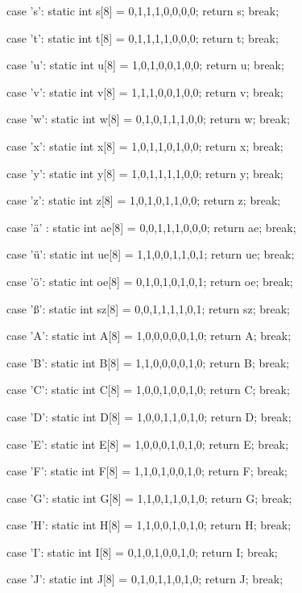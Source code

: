 {{    case 's':
    static int s[8] = {0,1,1,1,0,0,0,0};
    return s;
    break;

    case 't':
    static int t[8] = {0,1,1,1,1,0,0,0};
    return t;
    break;

    case 'u':
    static int u[8] = {1,0,1,0,0,1,0,0};
    return u;
    break;

    case 'v':
    static int v[8] = {1,1,1,0,0,1,0,0};
    return v;
    break;

    case 'w':
    static int w[8] = {0,1,0,1,1,1,0,0};
    return w;
    break;

    case 'x':
    static int x[8] = {1,0,1,1,0,1,0,0};
    return x;
    break;

    case 'y':
    static int y[8] = {1,0,1,1,1,1,0,0};
    return y;
    break;

    case 'z':
    static int z[8] = {1,0,1,0,1,1,0,0};
    return z;
    break;

    case 'ä'
    :
    static int ae[8] = {0,0,1,1,1,0,0,0};
    return ae;
    break;

    case 'ü':
    static int ue[8] = {1,1,0,0,1,1,0,1};
    return ue;
    break;

    case 'ö':
    static int oe[8] = {0,1,0,1,0,1,0,1};
    return oe;
    break;

    case 'ß':
    static int sz[8] = {0,0,1,1,1,1,0,1};
    return sz;
    break;

    case 'A':
    static int A[8] = {1,0,0,0,0,0,1,0};
    return A;
    break;

    case 'B':
    static int B[8] = {1,1,0,0,0,0,1,0};
    return B;
    break;

    case 'C':
    static int C[8] = {1,0,0,1,0,0,1,0};
    return C;
    break;
    
    case 'D':
    static int D[8] = {1,0,0,1,1,0,1,0};
    return D;
    break;

    case 'E':
    static int E[8] = {1,0,0,0,1,0,1,0};
    return E;
    break;

    case 'F':
    static int F[8] = {1,1,0,1,0,0,1,0};
    return F;
    break;

    case 'G':
    static int G[8] = {1,1,0,1,1,0,1,0};
    return G;
    break;
 
    case 'H':
    static int H[8] = {1,1,0,0,1,0,1,0};
    return H;
    break;

    case 'I':
    static int I[8] = {0,1,0,1,0,0,1,0};
    return I;
    break;

    case 'J':
    static int J[8] = {0,1,0,1,1,0,1,0};
    return J;
    break;

}}
